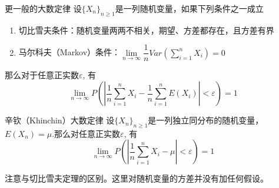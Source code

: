 
\begin{frame}

\begin{block}{更一般的大数定律}
设$\{X_n\}_{n\ge1}$是一列随机变量，如果下列条件之一成立
\begin{enumerate}
\item 切比雪夫条件：随机变量两两不相关，期望、方差都存在，且方差有界
\item 马尔科夫（Markov）条件：$\lim\limits_{n\to\infty} \dfrac{1}{n}Var\left( \sum\limits_{i=1}^n X_i \right) = 0$
\end{enumerate}
那么对于任意正实数$\varepsilon$, 有
$$\lim\limits_{n\to\infty} P\left( \left\vert \dfrac{1}{n}\sum\limits_{i=1}^n X_i - \dfrac{1}{n}\sum\limits_{i=1}^n E(X_i) \right\vert < \varepsilon \right) = 1$$
\end{block}

\end{frame}


\begin{frame}

\begin{block}{辛钦（Khinchin）大数定律}
设$\{X_n\}_{n\ge1}$是一列独立同分布的随机变量，$E(X_n) = \mu$.那么对任意正实数$\varepsilon$, 有
$$\lim\limits_{n\to\infty} P\left( \left\vert \dfrac{1}{n}\sum\limits_{i=1}^n X_i - \mu \right\vert < \varepsilon \right) = 1$$
\end{block}

\vspace{1em}
\pause

注意与切比雪夫定理的区别。这里对随机变量的方差并{\color{red}没有加任何假设}。

\end{frame}




